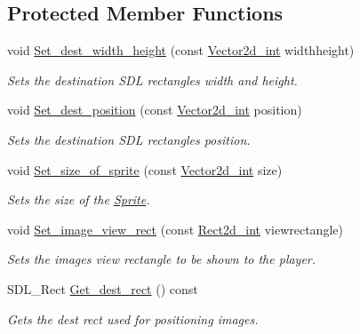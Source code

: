 \subsection*{Protected Member Functions}
\begin{DoxyCompactItemize}
\item 
void \hyperlink{classjetfuel_1_1draw_1_1Sprite_a089092a8511912f2b2c857ea111a29e6}{Set\+\_\+dest\+\_\+width\+\_\+height} (const \hyperlink{classjetfuel_1_1draw_1_1Vector2d}{Vector2d\+\_\+int} widthheight)
\begin{DoxyCompactList}\small\item\em Sets the destination S\+DL rectangle\textquotesingle{}s width and height. \end{DoxyCompactList}\item 
void \hyperlink{classjetfuel_1_1draw_1_1Sprite_a58a61883d32073cd96d70c2cd6025534}{Set\+\_\+dest\+\_\+position} (const \hyperlink{classjetfuel_1_1draw_1_1Vector2d}{Vector2d\+\_\+int} position)
\begin{DoxyCompactList}\small\item\em Sets the destination S\+DL rectangle\textquotesingle{}s position. \end{DoxyCompactList}\item 
void \hyperlink{classjetfuel_1_1draw_1_1Sprite_ad9e1cb6483d8ca4de5e3d7e72ca41973}{Set\+\_\+size\+\_\+of\+\_\+sprite} (const \hyperlink{classjetfuel_1_1draw_1_1Vector2d}{Vector2d\+\_\+int} size)
\begin{DoxyCompactList}\small\item\em Sets the size of the \hyperlink{classjetfuel_1_1draw_1_1Sprite}{Sprite}. \end{DoxyCompactList}\item 
void \hyperlink{classjetfuel_1_1draw_1_1Sprite_a684ee9b8ae0faa03878cb4b2f9e0ea19}{Set\+\_\+image\+\_\+view\+\_\+rect} (const \hyperlink{classjetfuel_1_1draw_1_1Rect2d}{Rect2d\+\_\+int} viewrectangle)
\begin{DoxyCompactList}\small\item\em Sets the image\textquotesingle{}s view rectangle to be shown to the player. \end{DoxyCompactList}\item 
S\+D\+L\+\_\+\+Rect \hyperlink{classjetfuel_1_1draw_1_1Sprite_aa5de791f11c4a8ee1a098963abbe4d18}{Get\+\_\+dest\+\_\+rect} () const
\begin{DoxyCompactList}\small\item\em Gets the dest rect used for positioning images. \end{DoxyCompactList}\item 

\end{DoxyCompactItemize}
